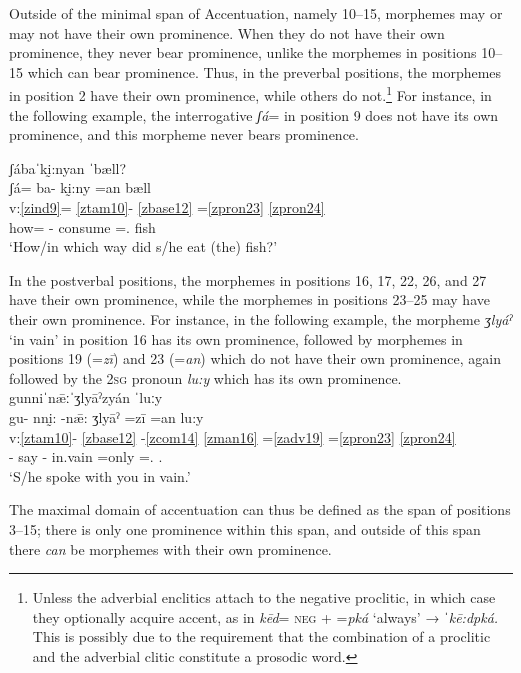 \documentclass[output=paper]{langscibook}
\begin{document}
Outside of the minimal span of Accentuation, namely 10–15, morphemes may or may not have their own prominence. When they do not have their own prominence, they never bear prominence, unlike the morphemes in positions 10–15 which can bear prominence. Thus, in the preverbal positions, the morphemes in position 2 have their own prominence, while others do not.\footnote{Unless the adverbial enclitics attach to the negative proclitic, in which case they optionally acquire accent, as in \textit{kēd}= \textsc{neg} + =\textit{pká} `always' → \textit{ˈkē:dpká.} This is possibly due to the requirement that the combination of a proclitic and the adverbial clitic constitute a prosodic word.}  For instance, in the following example, the interrogative \textit{ʃá}= in position 9 does not have its own prominence, and this morpheme never bears prominence. 

\ea\label{ex:key:zap:58}
{ʃábaˈkḭ:nyan ˈbæll?}\\
\glll ʃá= ba- kḭ:ny =an bæll\\
v:\ref{zind9}= \ref{ztam10}- \ref{zbase12} =\ref{zpron23} \ref{zpron24} \\
how\textsc{=} \Compl{}- consume =\Third\Sg{}.\Inf{} fish\\
\glt `How/in which way did s/he eat (the) fish?'
\z

In the postverbal positions, the morphemes in positions 16, 17, 22, 26, and 27 have their own prominence, while the morphemes in positions 23--25 may have their own prominence. For instance, in the following example, the morpheme \textit{ʒlyáˀ} `in vain' in position 16 has its own prominence, followed by morphemes in positions 19 (=\textit{zī}) and 23 (=\textit{an}) which do not have their own prominence, again followed by the \textsc{2sg} pronoun \textit{lu:y} which has its own prominence.\\

\ea\label{ex:key:zap:59}
{gunniˈnǣːˈʒlyāˀzyán ˈluːy}\\
\glll gu- nnḭ: -nǣ:  ʒlyāˀ =zī =an lu:y\\
v:\ref{ztam10}- \ref{zbase12} {}-\ref{zcom14}  \ref{zman16} =\ref{zadv19} =\ref{zpron23} \ref{zpron24} \\
\Compl{}- say -\Com{} in.vain =only =\Third\Sg{}.\Inf{} \Second\Sg{}.\Inf{}\\
\glt `S/he spoke with you in vain.'
\z

The maximal domain of accentuation can thus be defined as the span of positions 3--15; there is only one prominence within this span, and outside of this span there \textit{can} be morphemes with their own prominence.
\end{document}
